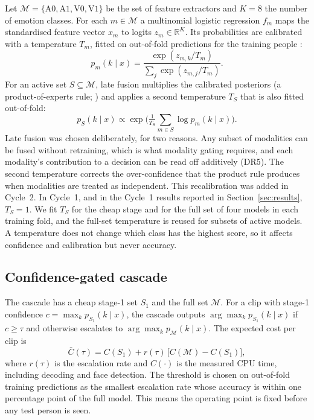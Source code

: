 Let $\mathcal{M}=\{\mathrm{A0},\mathrm{A1},\mathrm{V0},\mathrm{V1}\}$ be the set of feature extractors and $K=8$ the number of emotion classes. For each $m\in\mathcal{M}$ a multinomial logistic regression $f_m$ maps the standardised feature vector $x_m$ to logits $z_m\in\mathbb{R}^K$. Its probabilities are calibrated with a temperature $T_m$, fitted on out-of-fold predictions for the training people \citep{guo2017}:
\begin{equation}
p_m(k\mid x) = \frac{\exp(z_{m,k}/T_m)}{\sum_{j}\exp(z_{m,j}/T_m)}.
\end{equation}
For an active set $S\subseteq\mathcal{M}$, late fusion multiplies the calibrated posteriors (a product-of-experts rule; \citealp{kittler1998}) and applies a second temperature $T_S$ that is also fitted out-of-fold:
\begin{equation}\label{eq:lf}
p_S(k\mid x) \propto \exp\!\Big(\tfrac{1}{T_S}\sum_{m\in S}\log p_m(k\mid x)\Big).
\end{equation}
Late fusion was chosen deliberately, for two reasons. Any subset of modalities can be fused without retraining, which is what modality gating requires, and each modality's contribution to a decision can be read off additively (DR5). The second temperature corrects the over-confidence that the product rule produces when modalities are treated as independent. This recalibration was added in Cycle~2. In Cycle~1, and in the Cycle~1 results reported in Section~\ref{sec:results}, $T_S=1$. We fit $T_S$ for the cheap stage and for the full set of four models in each training fold, and the full-set temperature is reused for subsets of active models. A temperature does not change which class has the highest score, so it affects confidence and calibration but never accuracy.

\subsection{Confidence-gated cascade}

The cascade has a cheap stage-1 set $S_1$ and the full set $\mathcal{M}$. For a clip with stage-1 confidence $c=\max_k p_{S_1}(k\mid x)$, the cascade outputs $\arg\max_k p_{S_1}(k\mid x)$ if $c\ge\tau$ and otherwise escalates to $\arg\max_k p_{\mathcal{M}}(k\mid x)$. The expected cost per clip is
\begin{equation}
\bar{C}(\tau) = C(S_1) + r(\tau)\,\big[C(\mathcal{M})-C(S_1)\big],
\end{equation}
where $r(\tau)$ is the escalation rate and $C(\cdot)$ is the measured CPU time, including decoding and face detection. The threshold is chosen on out-of-fold training predictions as the smallest escalation rate whose accuracy is within one percentage point of the full model. This means the operating point is fixed before any test person is seen.

